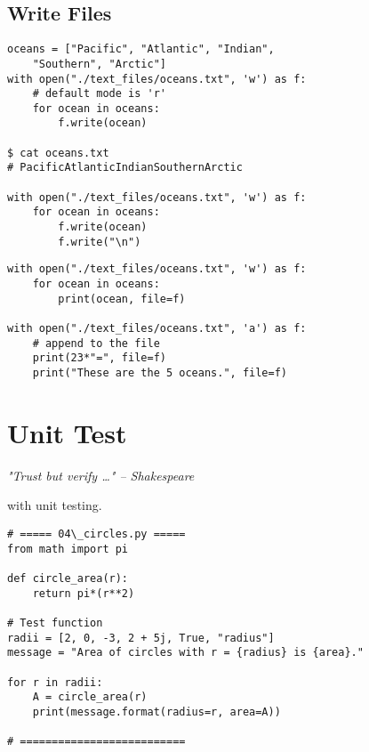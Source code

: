 \documentclass{beamer}
\begin{document}
\subsection{Write Files}

\begin{frame}[fragile]{}
\begin{verbatim}
oceans = ["Pacific", "Atlantic", "Indian", 
    "Southern", "Arctic"]
with open("./text_files/oceans.txt", 'w') as f:
    # default mode is 'r'
    for ocean in oceans:
        f.write(ocean)

$ cat oceans.txt
# PacificAtlanticIndianSouthernArctic

with open("./text_files/oceans.txt", 'w') as f:
    for ocean in oceans:
        f.write(ocean)
        f.write("\n")
\end{verbatim}
\end{frame}

\begin{frame}[fragile]{}
\begin{verbatim}
with open("./text_files/oceans.txt", 'w') as f:
    for ocean in oceans:
        print(ocean, file=f)

with open("./text_files/oceans.txt", 'a') as f:
    # append to the file
    print(23*"=", file=f)
    print("These are the 5 oceans.", file=f)

\end{verbatim}
\end{frame}

\section{Unit Test}

\begin{frame}[fragile]{}
\textit{"Trust but verify \dots" -- Shakespeare} \par
\hspace{3cm}with unit testing.
\begin{verbatim}
# ===== 04\_circles.py =====
from math import pi

def circle_area(r):
    return pi*(r**2)

# Test function
radii = [2, 0, -3, 2 + 5j, True, "radius"]
message = "Area of circles with r = {radius} is {area}."

for r in radii:
    A = circle_area(r)
    print(message.format(radius=r, area=A))

# ==========================
\end{verbatim}
\end{frame}
\end{document}
